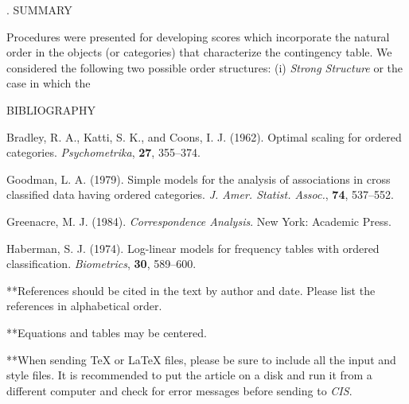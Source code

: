 \documentclass[12pt]{article}
\begin{document}
. SUMMARY


Procedures were presented for developing scores which incorporate the
natural order in the objects (or categories) that characterize the
contingency table.  We considered the following two possible order
structures:  (i)  {\it Strong Structure} or the case in which the
%
\vskip 3mm


\noindent BIBLIOGRAPHY
\vskip 3mm

\noindent Bradley, R. A., Katti, S. K.,  and Coons, I. J. (1962). Optimal
scaling for ordered categories. {\it Psychometrika}, {\bf 27}, 355--374.

\vskip 3mm

\noindent  Goodman, L. A. (1979). Simple models for the analysis of
associations in cross classified data having ordered categories.
{\it J. Amer. Statist. Assoc.},  {\bf 74}, 537--552.

\vskip 3mm

\noindent Greenacre, M. J. (1984). {\it Correspondence Analysis}.  New York: Academic Press.
\vskip 3mm



\noindent  Haberman, S. J. (1974). Log-linear models for frequency tables
with ordered classification. {\it Biometrics},  {\bf 30}, 589--600.
\vskip 1in




**References should be cited in the text by author and date.  Please list the references in alphabetical order.
\vskip 4mm


**Equations and tables may be centered.
\vskip 4mm


**When sending {\TeX} or {\LaTeX} files, please be sure to include all the
input and style files. It is recommended to put the article on a disk
and run it from a different computer and check for error messages before
sending to {\it CIS}.
\end{document}
